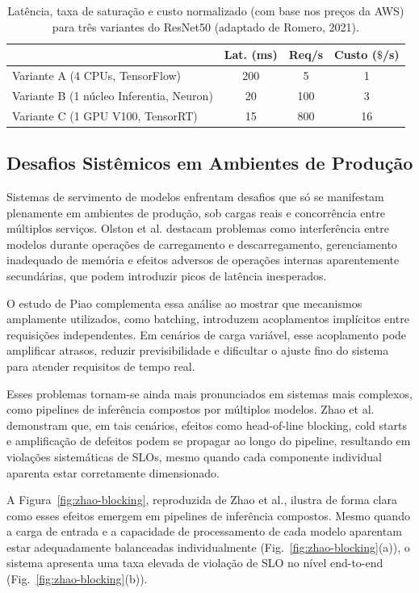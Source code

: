 \begin{table}[htbp]
  \centering
  \caption{Latência, taxa de saturação e custo normalizado (com base nos preços da AWS) para três variantes do ResNet50 (adaptado de Romero, 2021).}
  \label{tab:variantes_resnet}

  \begin{tabular}{@{}lccc@{}}
    \toprule
    & \textbf{Lat. (ms)} & \textbf{Req/s} & \textbf{Custo ($\$$/s)} \\ \midrule
    Variante A (4 CPUs, TensorFlow)          & 200 & 5   & 1   \\
    Variante B (1 núcleo Inferentia, Neuron)  & 20  & 100 & 3   \\
    Variante C (1 GPU V100, TensorRT)        & 15  & 800 & 16  \\ 
    \bottomrule
  \end{tabular}
\end{table}

\subsection{Desafios Sistêmicos em Ambientes de Produção}
Sistemas de servimento de modelos enfrentam desafios que só se manifestam plenamente em ambientes de produção, sob cargas reais e concorrência entre múltiplos serviços. Olston et al. destacam problemas como interferência entre modelos durante operações de carregamento e descarregamento, gerenciamento inadequado de memória e efeitos adversos de operações internas aparentemente secundárias, que podem introduzir picos de latência inesperados.

O estudo de Piao complementa essa análise ao mostrar que mecanismos amplamente utilizados, como batching, introduzem acoplamentos implícitos entre requisições independentes. Em cenários de carga variável, esse acoplamento pode amplificar atrasos, reduzir previsibilidade e dificultar o ajuste fino do sistema para atender requisitos de tempo real.

Esses problemas tornam-se ainda mais pronunciados em sistemas mais complexos, como pipelines de inferência compostos por múltiplos modelos. Zhao et al. demonstram que, em tais cenários, efeitos como head-of-line blocking, cold starts e amplificação de defeitos podem se propagar ao longo do pipeline, resultando em violações sistemáticas de SLOs, mesmo quando cada componente individual aparenta estar corretamente dimensionado.

A Figura~\ref{fig:zhao-blocking}, reproduzida de Zhao et al., ilustra de forma clara como esses efeitos emergem em pipelines de inferência compostos. Mesmo quando a carga de entrada e a capacidade de processamento de cada modelo aparentam estar adequadamente balanceadas individualmente (Fig.~\ref{fig:zhao-blocking}(a)), o sistema apresenta uma taxa elevada de violação de SLO no nível end-to-end (Fig.~\ref{fig:zhao-blocking}(b)).

